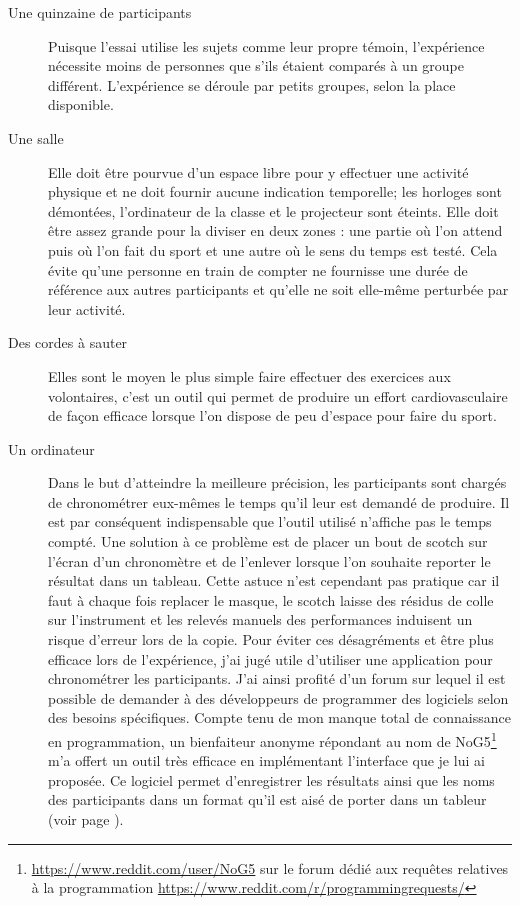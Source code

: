 \documentclass[12pt,fleqn,oneside,french,openany]{book} %
\begin{document}
\begin{description}
	\item[Une quinzaine de participants] Puisque l'essai utilise les sujets comme leur propre témoin, l'expérience nécessite moins de personnes que s'ils étaient comparés à un groupe différent. L'expérience se déroule par petits groupes, selon la place disponible.
	\item[Une salle] Elle doit être pourvue d'un espace libre pour y effectuer une activité physique et ne doit fournir aucune indication temporelle; les horloges sont démontées, l'ordinateur de la classe et le projecteur sont éteints. Elle doit être assez grande pour la diviser en deux zones : une partie où l'on attend puis où l'on fait du sport et une autre où le sens du temps est testé. Cela évite qu'une personne en train de compter ne fournisse une durée de référence aux autres participants et qu'elle ne soit elle-même perturbée par leur activité. 
	\item[Des cordes à sauter] Elles sont le moyen le plus simple faire effectuer des exercices aux volontaires, c'est un outil qui permet de produire un effort cardiovasculaire de façon efficace lorsque l'on dispose de peu d'espace pour faire du sport.
	\item[Un ordinateur] Dans le but d'atteindre la meilleure précision, les participants sont chargés de chronométrer eux-mêmes le temps qu'il leur est demandé de produire. Il est par conséquent indispensable que l'outil utilisé n'affiche pas le temps compté. Une solution à ce problème est de placer un bout de scotch sur l'écran d'un chronomètre et de l'enlever lorsque l'on souhaite reporter le résultat dans un tableau. Cette astuce n'est cependant pas pratique car il faut à chaque fois replacer le masque, le scotch laisse des résidus de colle sur l'instrument et les relevés manuels des performances induisent un risque d'erreur lors de la copie. Pour éviter ces désagréments et être plus efficace lors de l'expérience, j'ai jugé utile d'utiliser une application pour chronométrer les participants. J'ai ainsi profité d'un forum sur lequel il est possible de demander à des développeurs de programmer des logiciels selon des besoins spécifiques. Compte tenu de mon manque total de connaissance en programmation, un bienfaiteur anonyme répondant au nom de NoG5\footnote{\url{https://www.reddit.com/user/NoG5} sur le forum dédié aux requêtes relatives à la programmation \url{https://www.reddit.com/r/programmingrequests/}} m'a offert un outil très efficace en implémentant l'interface que je lui ai proposée. Ce logiciel permet d'enregistrer les résultats ainsi que les noms des participants dans un format qu'il est aisé de porter dans un tableur (voir page \pageref{sec:chrono}).
\end{description}
\end{document}
